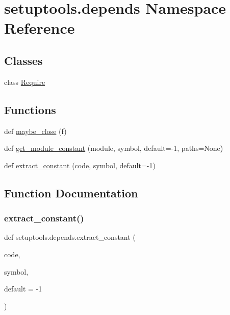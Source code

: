 \hypertarget{namespacesetuptools_1_1depends}{}\section{setuptools.\+depends Namespace Reference}
\label{namespacesetuptools_1_1depends}
\subsection*{Classes}
\begin{DoxyCompactItemize}
\item 
class \hyperlink{classsetuptools_1_1depends_1_1Require}{Require}
\end{DoxyCompactItemize}
\subsection*{Functions}
\begin{DoxyCompactItemize}
\item 
def \hyperlink{namespacesetuptools_1_1depends_a31c80f31ba714fa03597dedf762d244c}{maybe\+\_\+close} (f)
\item 
def \hyperlink{namespacesetuptools_1_1depends_a5a13c841cb5ec0ec368eb437b3e7c615}{get\+\_\+module\+\_\+constant} (module, symbol, default=-\/1, paths=None)
\item 
def \hyperlink{namespacesetuptools_1_1depends_a49bf4636dee480cc02cef0d9e81ca05e}{extract\+\_\+constant} (code, symbol, default=-\/1)
\end{DoxyCompactItemize}


\subsection{Function Documentation}
\mbox{\label{namespacesetuptools_1_1depends_a49bf4636dee480cc02cef0d9e81ca05e}} 
\subsubsection{\texorpdfstring{extract\+\_\+constant()}{extract\_constant()}}
{\footnotesize\ttfamily def setuptools.\+depends.\+extract\+\_\+constant (\begin{DoxyParamCaption}\item[{}]{code,  }\item[{}]{symbol,  }\item[{}]{default = {\ttfamily -\/1} }\end{DoxyParamCaption})}

